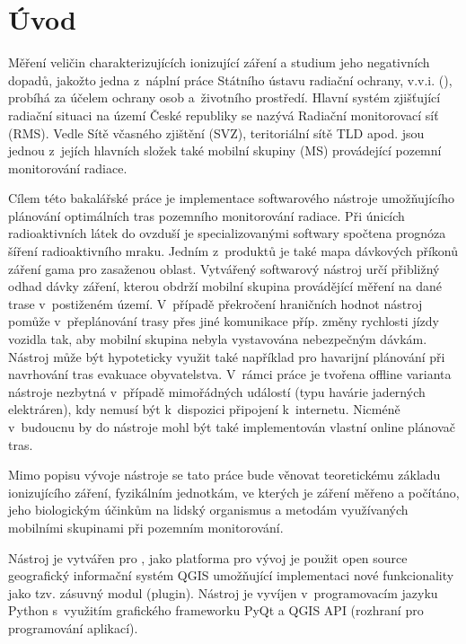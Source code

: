 \chapter{Úvod}
\label{1-uvod} Měření veličin charakterizujících ionizující záření a
studium jeho negativních dopadů, jakožto jedna z~náplní práce Státního
ústavu radiační ochrany, v.v.i. (), probíhá za účelem ochrany
osob a~životního prostředí.  Hlavní systém zjišťující radiační situaci
na území České republiky se nazývá Radiační monitorovací síť
(RMS). Vedle Sítě včasného zjištění (SVZ), teritoriální sítě TLD
apod. jsou jednou z~jejích hlavních složek také mobilní skupiny (MS)
provádející pozemní monitorování radiace. \cite{suroRMS}

Cílem této bakalářské práce je implementace softwarového nástroje
umožňujícího plánování optimálních tras pozemního monitorování
radiace. Při únicích radioaktivních látek do ovzduší je
specializovanými softwary spočtena prognóza šíření radioaktivního
mraku. Jedním z~produktů je také mapa dávkových příkonů záření gama
pro zasaženou oblast. Vytvářený softwarový nástroj určí přibližný
odhad dávky záření, kterou obdrží mobilní skupina provádějící měření
na dané trase v~postiženém území. V~případě překročení hraničních
hodnot nástroj pomůže v~přeplánování trasy přes jiné komunikace
příp. změny rychlosti jízdy vozidla tak, aby mobilní skupina nebyla
vystavována nebezpečným dávkám.  Nástroj může být hypoteticky využit
také například pro havarijní plánování při navrhování tras evakuace
obyvatelstva. V~rámci práce je tvořena offline varianta nástroje
nezbytná v~případě mimořádných událostí (typu havárie jaderných
elektráren), kdy nemusí být k~dispozici připojení k~internetu. Nicméně
v~budoucnu by do nástroje mohl být také implementován vlastní online
plánovač tras.

Mimo popisu vývoje nástroje se tato práce bude věnovat teoretickému
základu ionizujícího záření, fyzikálním jednotkám, ve kterých je
záření měřeno a počítáno, jeho biologickým účinkům na lidský
organismus a metodám využívaných mobilními skupinami při pozemním
monitorování.

Nástroj je vytvářen pro , jako platforma pro vývoj je použit
open source geo\-grafický informační systém QGIS umožňující implementaci
nové funkcionality jako tzv. zásuvný modul (plugin). Nástroj je
vyvíjen v~programovacím jazyku Python s~využitím grafického frameworku
PyQt a QGIS API (rozhraní pro programování aplikací).

